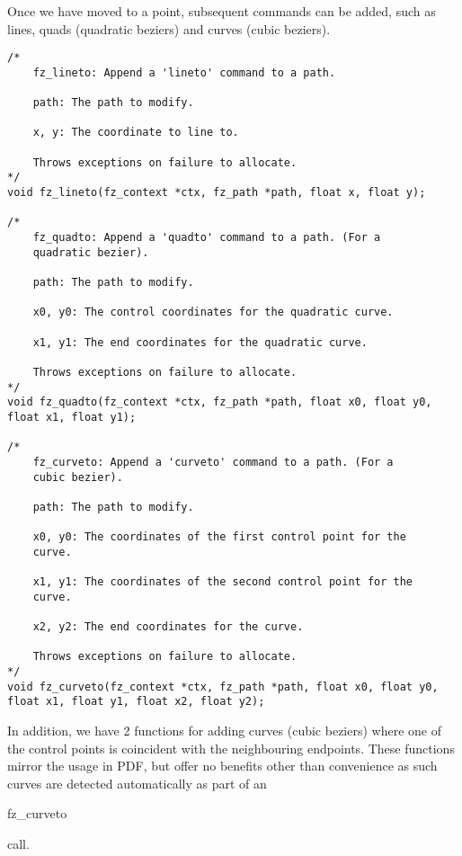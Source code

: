 \documentclass[oneside]{book}
\begin{document}
Once we have moved to a point, subsequent commands can be added, such as lines, quads (quadratic beziers) and curves (cubic beziers). 

\begin{lstlisting}
/*
	fz_lineto: Append a 'lineto' command to a path.

	path: The path to modify.

	x, y: The coordinate to line to.

	Throws exceptions on failure to allocate.
*/
void fz_lineto(fz_context *ctx, fz_path *path, float x, float y);

/*
	fz_quadto: Append a 'quadto' command to a path. (For a
	quadratic bezier).

	path: The path to modify.

	x0, y0: The control coordinates for the quadratic curve.

	x1, y1: The end coordinates for the quadratic curve.

	Throws exceptions on failure to allocate.
*/
void fz_quadto(fz_context *ctx, fz_path *path, float x0, float y0, float x1, float y1);

/*
	fz_curveto: Append a 'curveto' command to a path. (For a
	cubic bezier).

	path: The path to modify.

	x0, y0: The coordinates of the first control point for the
	curve.

	x1, y1: The coordinates of the second control point for the
	curve.

	x2, y2: The end coordinates for the curve.

	Throws exceptions on failure to allocate.
*/
void fz_curveto(fz_context *ctx, fz_path *path, float x0, float y0, float x1, float y1, float x2, float y2);
\end{lstlisting}

In addition, we have 2 functions for adding curves (cubic beziers) where one of the control points is coincident with the neighbouring endpoints. These functions mirror the usage in PDF, but offer no benefits other than convenience as such curves are detected automatically as part of an \begin{tt}fz\_curveto\end{tt} call.
\end{document}
